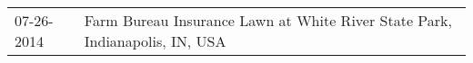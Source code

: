 \begin{supertabular}{ll}
 07-26-2014 &  Farm Bureau Insurance Lawn at White River State Park, Indianapolis, IN, USA \\
\end{supertabular}
